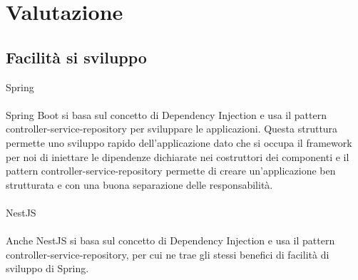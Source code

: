\section{Valutazione}
\subsection{Facilità si sviluppo}
Spring
\\\\
Spring Boot si basa sul concetto di Dependency Injection e usa il pattern controller-service-repository
per sviluppare le applicazioni. Questa struttura permette uno sviluppo rapido dell'applicazione dato
che si occupa il framework per noi di iniettare le dipendenze dichiarate nei costruttori dei componenti e 
il pattern controller-service-repository permette di creare un'applicazione ben strutturata e con una 
buona separazione delle responsabilità.
\\\\
NestJS
\\\\
Anche NestJS si basa sul concetto di Dependency Injection e usa il pattern controller-service-repository, per
cui ne trae gli stessi benefici di facilità di sviluppo di Spring.


